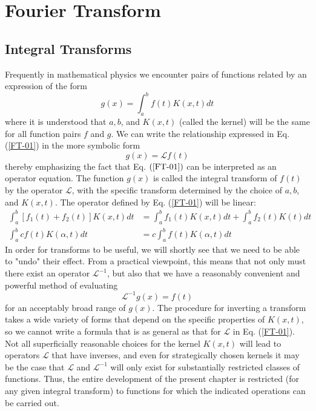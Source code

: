 \chapter{Fourier Transform }
\section{Integral Transforms}
Frequently in mathematical physics we encounter pairs of functions related by an expression of the form
\begin{equation}
g(x)=\int_{a}^{b} f(t) K(x, t) d t\label{FT-01}
\end{equation}
where it is understood that $a, b$, and $K(x, t)$ (called the kernel) will be the same for all function pairs $f$ and $g$. We can write the relationship expressed in Eq. (\ref{FT-01}) in the more symbolic form
\begin{equation}
g(x)=\mathcal{L} f(t)
\end{equation}
thereby emphasizing the fact that Eq. $(\ref{FT-01})$ can be interpreted as an operator equation. The function $g(x)$ is called the integral transform of $f(t)$ by the operator $\mathcal{L}$, with the specific transform determined by the choice of $a, b$, and $K(x, t)$. The operator defined by Eq. (\ref{FT-01}) will be linear:
\begin{align}
\int_{a}^{b}\left[f_{1}(t)+f_{2}(t)\right] K(x, t) d t&=\int_{a}^{b} f_{1}(t) K(x, t) d t+\int_{a}^{b} f_{2}(t) K(t) d t \\
\int_{a}^{b} c f(t) K(\alpha, t) d t&=c \int_{a}^{b} f(t) K(\alpha, t) d t
\end{align}
In order for transforms to be useful, we will shortly see that we need to be able to "undo" their effect. From a practical viewpoint, this means that not only must there exist an operator $\mathcal{L}^{-1}$, but also that we have a reasonably convenient and powerful method of evaluating
\begin{equation}
\mathcal{L}^{-1} g(x)=f(t)
\end{equation}
for an acceptably broad range of $g(x)$. The procedure for inverting a transform takes a wide variety of forms that depend on the specific properties of $K(x, t)$, so we cannot write a formula that is as general as that for $\mathcal{L}$ in Eq. (\ref{FT-01}).\\
Not all superficially reasonable choices for the kernel $K(x, t)$ will lead to operators $\mathcal{L}$ that have inverses, and even for strategically chosen kernels it may be the case that $\mathcal{L}$ and $\mathcal{L}^{-1}$ will only exist for substantially restricted classes of functions. Thus, the entire development of the present chapter is restricted (for any given integral transform) to functions for which the indicated operations can be carried out.\\

